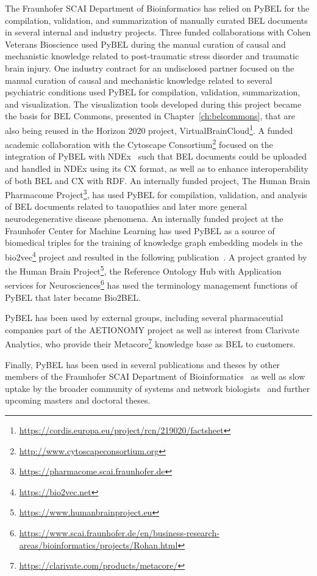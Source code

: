 The Fraunhofer SCAI Department of Bioinformatics has relied on PyBEL for the compilation, validation, and summarization of manually curated BEL documents in several internal and industry projects.
Three funded collaborations with Cohen Veterans Bioscience used PyBEL during the manual curation of causal and mechanistic knowledge related to post-traumatic stress disorder and traumatic brain injury.
One industry contract for an undisclosed partner focused on the manual curation of causal and mechanistic knowledge related to several psychiatric conditions used PyBEL for compilation, validation, summarization, and visualization.
The visualization tools developed during this project became the basis for BEL Commons, presented in Chapter~\ref{ch:belcommons}, that are also being reused in the Horizon 2020 project, VirtualBrainCloud\footnote{\url{https://cordis.europa.eu/project/rcn/219020/factsheet}}.
A funded academic collaboration with the Cytoscape Consortium\footnote{\url{http://www.cytoscapeconsortium.org}} focused on the integration of PyBEL with NDEx~\cite{Pratt2015} such that BEL documents could be uploaded and handled in NDEx using its CX format, as well as to enhance interoperability of both \ac{BEL} and CX with \ac{RDF}.
An internally funded project, The Human Brain Pharmacome Project\footnote{\url{https://pharmacome.scai.fraunhofer.de}}, has used PyBEL for compilation, validation, and analysis of BEL documents related to tauopathies and later more general neurodegenerative disease phenomena.
An internally funded project at the Fraunhofer Center for Machine Learning has used PyBEL as a source of biomedical triples for the training of knowledge graph embedding models in the bio2vec\footnote{\url{https://bio2vec.net}} project and resulted in the following publication~\cite{Ali2019}.
A project granted by the Human Brain Project\footnote{\url{https://www.humanbrainproject.eu}}, the Reference Ontology Hub with Application services for Neurosciences\footnote{\url{https://www.scai.fraunhofer.de/en/business-research-areas/bioinformatics/projects/Rohan.html}} has used the terminology management functions of PyBEL that later became Bio2BEL\@.

PyBEL has been used by external groups, including several pharmaceutial companies part of the AETIONOMY project as well as interest from Clarivate Analytics, who provide their Metacore\footnote{\url{https://clarivate.com/products/metacore/}} knowledge base as BEL to customers.

Finally, PyBEL has been used in several publications and theses by other members of the Fraunhofer SCAI Department of Bioinformatics~\cite{Domingo-Fernandez2018,Domingo-Fernandez2019a,Mubeen2019} as well as slow uptake by the broader community of systems and network biologists~\cite{Kwon2019,Gyori2017} and further upcoming masters and doctoral theses.
